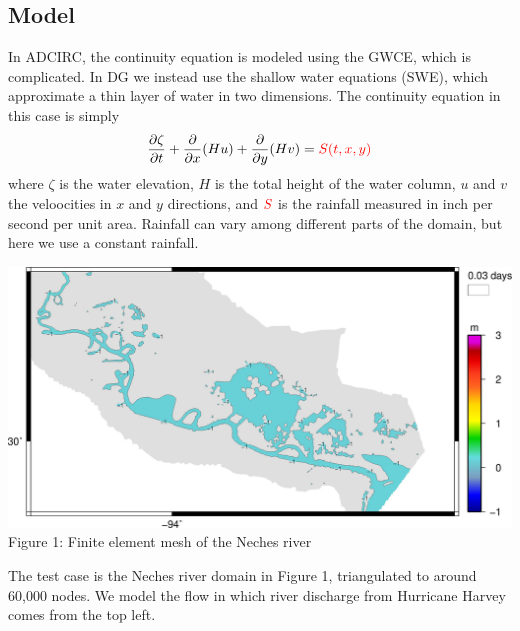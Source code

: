 \documentclass[american]{article}
\newcommand\pd[2]{\frac{\partial #1}{\partial #2}}
\begin{document}
\begin{multicols}{3}
\section*{Model}
In ADCIRC, the continuity equation is modeled using the GWCE, which is complicated. In DG we instead use the shallow water equations (SWE), which approximate a thin layer of water in two dimensions. The continuity equation in this case is simply
\begin{align*}
  \pd{\zeta}{t} + \pd{}{x} (Hu) + \pd{}{y} (Hv) = \color{red} S(t,x,y)
\end{align*}
where $\zeta$ is the water elevation, $H$ is the total height of the water column, $u$ and $v$ the veloocities in $x$ and $y$ directions, and $\color{red} S$ is the rainfall measured in inch per second per unit area. Rainfall can vary among different parts of the domain, but here we use a constant rainfall.

\begin{center}
  \vspace{5mm}
  \includegraphics[width=0.95\linewidth]{media/grid.jpg}
  Figure 1: Finite element mesh of the Neches river
\end{center}

The test case is the Neches river domain in Figure 1, triangulated to around 60,000 nodes. We model the flow in which river discharge from Hurricane Harvey comes from the top left.

\end{multicols}
\end{document}

